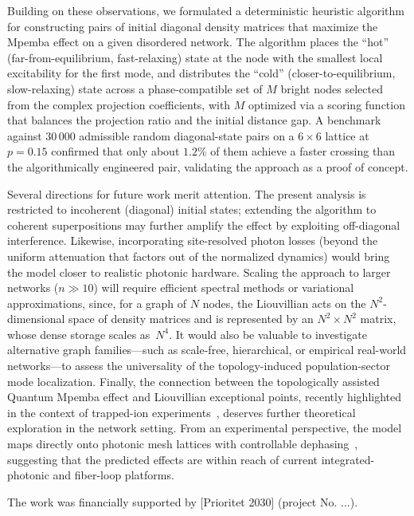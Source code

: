 \documentclass[pdflatex,sn-mathphys-num]{sn-jnl}
\begin{document}
Building on these observations, we formulated a deterministic
heuristic algorithm for constructing pairs of initial diagonal density
matrices that maximize the Mpemba effect on a given disordered
network. The algorithm places the ``hot'' (far-from-equilibrium,
fast-relaxing) state at the node with the smallest local excitability
for the first mode, and distributes the ``cold''
(closer-to-equilibrium, slow-relaxing) state across a phase-compatible
set of $M$ bright nodes selected from the complex projection coefficients,
with $M$ optimized via a scoring function that balances the
projection ratio and the initial distance gap. A benchmark against
$30\,000$ admissible random diagonal-state pairs on a $6 \times 6$
lattice at $p = 0.15$ confirmed that only about $1.2\%$ of them
achieve a faster crossing than the algorithmically engineered pair,
validating the approach as a proof of concept.

Several directions for future work merit attention.
The present analysis is restricted to incoherent (diagonal) initial
states; extending the algorithm to coherent superpositions may
further amplify the effect by exploiting off-diagonal interference.
Likewise, incorporating site-resolved photon losses (beyond the
uniform attenuation that factors out of the normalized dynamics)
would bring the model closer to realistic photonic hardware.
Scaling the approach to larger networks ($n \gg 10$) will require
efficient spectral methods or variational approximations, since, for a
graph of $N$ nodes, the Liouvillian acts on the $N^2$-dimensional space
of density matrices and is represented by an $N^2 \times N^2$ matrix,
whose dense storage scales as~$N^4$.  It would also be valuable to
investigate alternative graph families---such as scale-free,
hierarchical, or empirical real-world networks---to assess the universality of the topology-induced population-sector mode localization.  Finally,
the connection between the topologically assisted Quantum Mpemba effect and Liouvillian exceptional points, recently highlighted in the context
of trapped-ion experiments~\cite{Zhang2025}, deserves further theoretical
exploration in the network setting.  From an experimental
perspective, the model maps directly onto photonic mesh lattices with
controllable dephasing~\cite{Longhi2024,Longhi2024bosonic}, suggesting that the predicted effects
are within reach of current integrated-photonic and fiber-loop
platforms.

\backmatter

The work was financially supported by [Prioritet 2030] (project No. ...).
\end{document}
